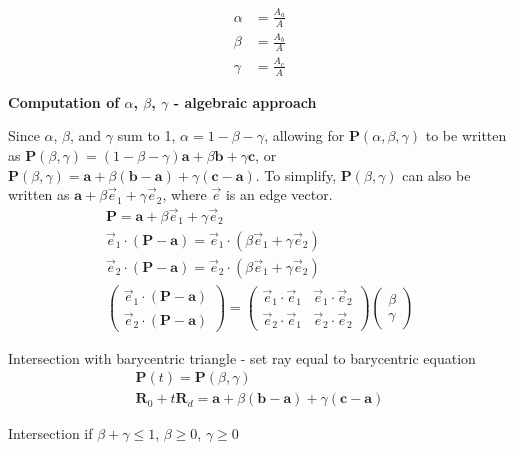 \documentclass[12pt]{article}
\begin{document}
\begin{align*}
    \alpha &= \frac{A_a}{A}\\
    \beta &= \frac{A_b}{A}\\
    \gamma &= \frac{A_c}{A}
\end{align*}

\textbf{Computation of $\alpha$, $\beta$, $\gamma$ - algebraic approach}

Since $\alpha$, $\beta$, and $\gamma$ sum to 1, $\alpha = 1 - \beta - \gamma$,
allowing for $\bm P(\alpha,\beta,\gamma)$ to be written as $\bm P(\beta,
\gamma) = (1-\beta-\gamma)\bm a + \beta \bm b + \gamma \bm c$, or
$\bm P(\beta,\gamma) = \bm a + \beta (\bm b - \bm a) + \gamma (\bm c
- \bm a)$. To simplify, $\bm P(\beta,\gamma)$ can also be written as
$\bm a + \beta \vec e_1 + \gamma \vec e_2$, where $\vec e$ is an edge vector.
\begin{gather*}
    \bm P = \bm a + \beta \vec e_1 + \gamma \vec e_2\\
    \vec e_1 \cdot (\bm P - \bm a) = \vec e_1 \cdot (\beta \vec e_1 + \gamma \vec e_2)\\
    \vec e_2 \cdot (\bm P - \bm a) = \vec e_2 \cdot (\beta \vec e_1 + \gamma \vec e_2)\\
    \begin{pmatrix}
        \vec e_1 \cdot (\bm P - \bm a)\\
        \vec e_2 \cdot (\bm P - \bm a)
    \end{pmatrix}
    =
    \begin{pmatrix}
        \vec e_1 \cdot \vec e_1 & \vec e_1 \cdot \vec e_2\\
        \vec e_2 \cdot \vec e_1 & \vec e_2 \cdot \vec e_2
    \end{pmatrix}
    \begin{pmatrix}
        \beta\\
        \gamma
    \end{pmatrix}
\end{gather*}

Intersection with barycentric triangle - set ray equal to barycentric equation
\begin{gather*}
    \bm P(t) = \bm P(\beta,\gamma)\\
    \bm R_0 + t \bm R_d = \bm a + \beta (\bm b - \bm a) + \gamma
    (\bm c - \bm a)
\end{gather*}

Intersection if $\beta + \gamma \le 1$, $\beta \ge 0$, $\gamma \ge 0$
\end{document}
